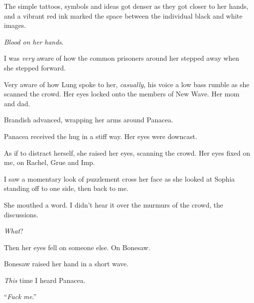 The simple tattoos, symbols and ideas got denser as they got closer to her hands, and a vibrant red ink marked the space between the individual black and white images.



\emph{Blood on her hands}.



I was \emph{very }aware of how the common prisoners around her stepped away when she stepped forward.



Very aware of how Lung spoke to her, \emph{casually}, his voice a low bass rumble as she scanned the crowd.  Her eyes locked onto the members of New Wave.  Her mom and dad.



Brandish advanced, wrapping her arms around Panacea.



Panacea received the hug in a stiff way.  Her eyes were downcast.



As if to distract herself, she raised her eyes, scanning the crowd.  Her eyes fixed on me, on Rachel, Grue and Imp.



I saw a momentary look of puzzlement cross her face as she looked at Sophia standing off to one side, then back to me.



She mouthed a word.  I didn't hear it over the murmurs of the crowd, the discussions.



\emph{What}?



Then her eyes fell on someone else.  On Bonesaw.



Bonesaw raised her hand in a short wave.



\emph{This} time I heard Panacea.



``\emph{Fuck me}.''





